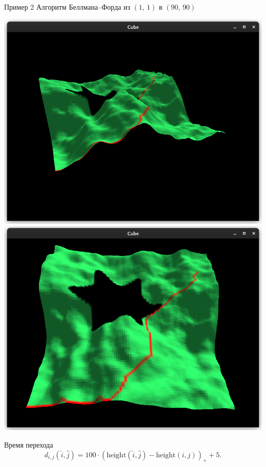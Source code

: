     \begin{frame}[t]{Пример 2}
        Алгоритм Беллмана--Форда из $(1,\,1)$ в $(90,\,90)$
        \begin{center}
            \includegraphics[scale=0.18]{content/bf.png}
            \includegraphics[scale=0.18]{content/bf-top.png}
        \end{center}
        Время перехода
        \[
            d_{i,j}(\hat i, \hat j) = 100\cdot(\mathrm{height}(\hat i, \hat j) - \mathrm{height}(i, j))_{+} + 5.
        \]
    \end{frame}
